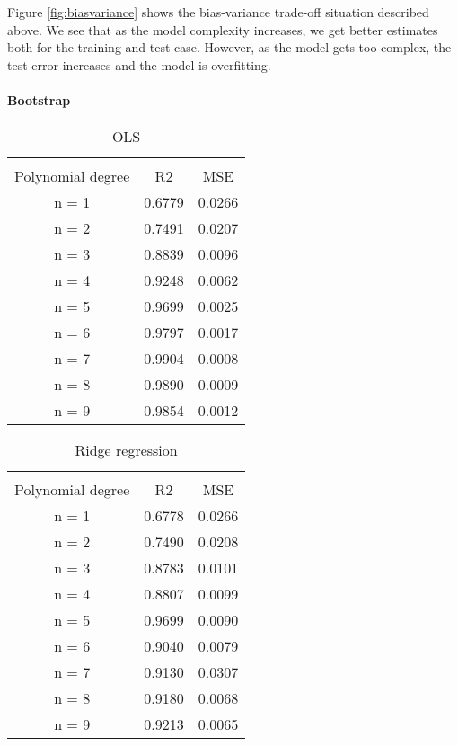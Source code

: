 \documentclass[a4paper]{article}
\begin{document}
Figure \ref{fig:biasvariance} shows the bias-variance trade-off situation described above.
We see that as the model complexity increases, we get better estimates both for the training and test case. However, as the model gets too complex, the test error increases and the model is overfitting.

\paragraph{Bootstrap}

\begin{table}[ht]
\caption{OLS}
\begin{center}
\begin{tabular}{ccc}
	\hline
	\multicolumn{3}{c}{}\\
	Polynomial degree&R2&MSE\\
	\hline
	n = 1&0.6779&0.0266\\
	n = 2&0.7491&0.0207\\
	n = 3&0.8839&0.0096\\
	n = 4&0.9248&0.0062\\
	n = 5&0.9699&0.0025\\
	n = 6&0.9797&0.0017 \\
	n = 7&0.9904&0.0008 \\
	n = 8&0.9890&0.0009 \\
	n = 9&0.9854&0.0012 \\
\end{tabular}
\end{center}
\label{tab:R2MSE_OLS}
\end{table}


\begin{table}[ht]
\caption{Ridge regression}
\begin{center}
\begin{tabular}{ccc}
	\hline
	\multicolumn{3}{c}{}\\
	Polynomial degree&R2&MSE\\
	\hline
	n = 1&0.6778&0.0266\\
	n = 2&0.7490&0.0208\\
	n = 3&0.8783&0.0101\\
	n = 4&0.8807&0.0099\\
	n = 5&0.9699&0.0090\\
	n = 6&0.9040&0.0079\\
	n = 7&0.9130&0.0307 \\
	n = 8&0.9180&0.0068 \\
	n = 9&0.9213&0.0065 \\
\end{tabular}
\end{center}
\label{tab:R2MSE_ridge}
\end{table}
\end{document}
